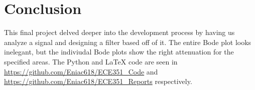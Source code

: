 \documentclass[12pt]{report}
\begin{document}
\section{Conclusion}
This final project delved deeper into the development process by having us analyze a signal and designing a filter based off of it. The entire Bode plot looks inelegant, but the indiviudal Bode plots show the right attenuation for the specified areas. The Python and \LaTeX{} code are seen in \url{https://github.com/Eniac618/ECE351_Code} and \url{https://github.com/Eniac618/ECE351_Reports} respectively.
\end{document}
